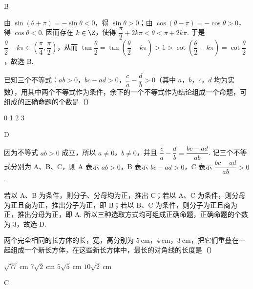 \begin{answer}
B
\end{answer}

\begin{solution}
由 \(\sin(\theta+\pi)=-\sin\theta<0\)，得 \(\sin\theta>0\)；由 \(\cos(\theta-\pi)=-\cos\theta>0\)，得 \(\cos\theta<0\). 因而存在 \(k\in\Z\)，使得 \(\dfrac{\pi}{2}+2k\pi<\theta<\pi+2k\pi\). 于是 \(\dfrac{\theta}{2}-k\pi\in\left(\dfrac{\pi}{4},\dfrac{\pi}{2}\right)\)，从而 \(\tan\dfrac{\theta}{2}=\tan\left(\dfrac{\theta}{2}-k\pi\right)>1>\cot\left(\dfrac{\theta}{2}-k\pi\right)=\cot\dfrac{\theta}{2}\)，故选 B.
\end{solution}

\begin{problem}
已知三个不等式：\(ab>0\)，\(bc-ad>0\)，\(\dfrac{c}{a}-\dfrac{d}{b}>0\)（其中 \(a\)，\(b\)，\(c\)，\(d\) 均为实数），用其中两个不等式作为条件，余下的一个不等式作为结论组成一个命题，可组成的正确命题的个数是（\quad）

\choices
    {0}
    {1}
    {2}
    {3}
\end{problem}

\begin{answer}
D
\end{answer}

\begin{solution}
因为不等式 \(ab>0\) 成立，所以 \(a\ne0\)，\(b\ne0\)，并且 \(\dfrac{c}{a}-\dfrac{d}{b}=\dfrac{bc-ad}{ab}\). 记三个不等式分别为 A、B、C，则 A 表示 \(ab>0\)，B 表示 \(bc-ad>0\)，C 表示 \(\dfrac{bc-ad}{ab}>0\).

若以 A、B 为条件，则分子、分母均为正，推出 C；若以 A、C 为条件，则分母为正且商为正，推出分子为正，即 B；若以 B、C 为条件，则分子为正且商为正，推出分母为正，即 A. 所以三种选取方式均可组成正确命题，正确命题的个数为 \(3\)，故选 D.
\end{solution}

\begin{problem}
两个完全相同的长方体的长，宽，高分别为 \(5\mathrm{~cm}\)，\(4\mathrm{~cm}\)，\(3\mathrm{~cm}\)，把它们重叠在一起组成一个新长方体，在这些新长方体中，最长的对角线的长度是（\quad）

\choices
    {\(\sqrt{77}\mathrm{~cm}\)}
    {\(7\sqrt{2}\mathrm{~cm}\)}
    {\(5\sqrt{5}\mathrm{~cm}\)}
    {\(10\sqrt{2}\mathrm{~cm}\)}
\end{problem}

\begin{answer}
C
\end{answer}

